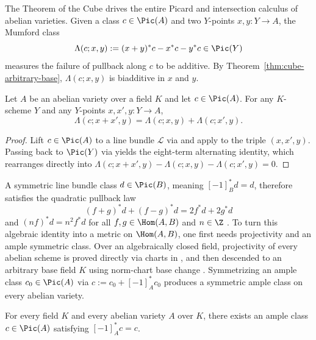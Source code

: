 The Theorem of the Cube drives the entire Picard and intersection calculus of
abelian varieties. Given a class $c \in \Pic(A)$ and two $Y$-points
$x, y : Y \to A$, the Mumford class
\[
  \Lambda(c; x, y) := (x + y)^* c - x^* c - y^* c \in \Pic(Y)
\]
measures the failure of pullback along $c$ to be additive. By
Theorem~\ref{thm:cube-arbitrary-base}, $\Lambda(c; x, y)$ is biadditive in $x$
and $y$.

\begin{lemma}
\label{lem:mumford-additive}
Let $A$ be an abelian variety over a field $K$ and let $c \in \Pic(A)$. For any
$K$-scheme $Y$ and any $Y$-points $x, x', y : Y \to A$,
\[
  \Lambda(c; x + x', y) = \Lambda(c; x, y) + \Lambda(c; x', y).
\]
\end{lemma}

\begin{proof}
Lift $c \in \Pic(A)$ to a line bundle $\mathcal{L}$ via
 and apply
 to the triple $(x, x', y)$. Passing
back to $\Pic(Y)$ via  yields the
eight-term alternating identity, which rearranges directly into
$\Lambda(c; x + x', y) - \Lambda(c; x, y) - \Lambda(c; x', y) = 0$.
\end{proof}

A symmetric line bundle class $d \in \Pic(B)$, meaning $[-1]_B^* d = d$,
therefore satisfies the quadratic pullback law
\[
  (f + g)^* d + (f - g)^* d = 2 f^* d + 2 g^* d
\]
and $(n f)^* d = n^2 f^* d$ for all $f, g \in \Hom(A, B)$ and $n \in \Z$
. To turn
this algebraic identity into a metric on $\Hom(A, B)$, one first needs
projectivity and an ample symmetric class. Over an algebraically closed field,
projectivity of every abelian scheme is proved directly via charts in
, and then
descended to an arbitrary base field $K$ using norm-chart base change
. Symmetrizing an
ample class $c_0 \in \Pic(A)$ via $c := c_0 + [-1]_A^* c_0$ produces a
symmetric ample class on every abelian variety.

\begin{proposition}
\label{prop:symm-ample}
For every field $K$ and every abelian variety $A$ over $K$, there exists an
ample class $c \in \Pic(A)$ satisfying $[-1]_A^* c = c$.
\end{proposition}

